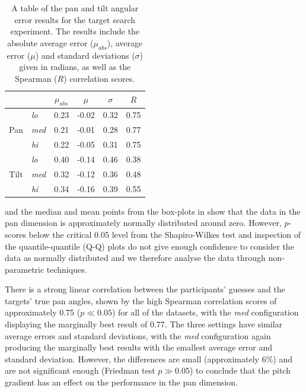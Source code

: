 \documentclass[sigconf, review=true, screen=true, anonymous=true]{acmart}
\begin{document}
\begin{table}
  \centering
  \caption{A table of the pan and tilt angular error results for the target search experiment. The results include the absolute average error ($\mu_{abs}$), average error ($\mu$) and standard deviations ($\sigma$) given in radians, as well as the Spearman ($R$) correlation scores.}
  \label{tab:results}
  \begin{tabular}{|c|l|c|c|c|c|}
    \hline
    \multicolumn{2}{|c|}{} & $\mu_{abs}$ & $\mu$ & $\sigma$ & $R$ \\\hline\hline
    & \emph{lo}  & 0.23 & -0.02 & 0.32 & 0.75 \\\cline{2-6}
    Pan & \emph{med} & 0.21 & -0.01 & 0.28 & 0.77 \\\cline{2-6}
    & \emph{hi}  & 0.22 & -0.05 & 0.31 & 0.75 \\\hline\hline
    & \emph{lo}  & 0.40 & -0.14 & 0.46 & 0.38 \\\cline{2-6}
    Tilt & \emph{med} & 0.32 & -0.12 & 0.36 & 0.48 \\\cline{2-6}
    & \emph{hi}  & 0.34 & -0.16 & 0.39 & 0.55 \\\hline
  \end{tabular}
\end{table}

 and the median and mean points from the box-plots in  show that the data in the pan dimension is approximately normally distributed around zero.
However, $p$-scores below the critical 0.05 level from the Shapiro-Wilkes test and inspection of the quantile-quantile (Q-Q) plots do not give enough confidence to consider the data as normally distributed and we therefore analyse the data through non-parametric techniques. 

There is a strong linear correlation between the participants' guesses and the targets' true pan angles, shown by the high Spearman correlation scores of approximately 0.75 ($p \ll 0.05$) for all of the datasets, with the \emph{med} configuration displaying the marginally best result of 0.77.
The three settings have similar average errors and standard deviations, with the \emph{med} configuration again producing the marginally best results with the smallest average error and standard deviation.
However, the differences are small (approximately 6\%) and are not significant enough (Friedman test $p \gg 0.05$) to conclude that the pitch gradient has an effect on the performance in the pan dimension. 
\end{document}

